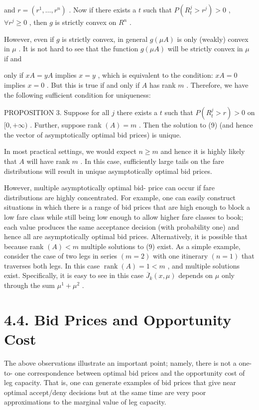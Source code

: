 and \(r = (r^{1},\ldots ,r^{n})\) . Now if there exists a \(t\) such
that \(P(R_{t}^{j} > r^{j}) > 0\) , \(\forall r^{j}\geq 0\) , then \(g\)
is strictly convex on \(R^{n}\) .

However, even if \(g\) is strictly convex, in general \(g(\mu A)\) is
only (weakly) convex in \(\mu\) . It is not hard to see that the
function \(g(\mu A)\) will be strictly convex in \(\mu\) if and

only if \(xA = yA\) implies \(x = y\) , which is equivalent to the
condition: \(xA = 0\) implies \(x = 0\) . But this is true if and only
if \(A\) has rank \(m\) . Therefore, we have the following sufficient
condition for uniqueness:

PROPOSITION 3. Suppose for all \(j\) there exists a \(t\) such that
\(P(R_{t}^{j} > r) > 0\) on \([0, + \infty)\) . Further, suppose rank
\((A) = m\) . Then the solution to (9) (and hence the vector of
asymptotically optimal bid prices) is unique.

In most practical settings, we would expect \(n\geqslant m\) and hence
it is highly likely that \(A\) will have rank \(m\) . In this case,
sufficiently large tails on the fare distributions will result in unique
asymptotically optimal bid prices.

However, multiple asymptotically optimal bid- price can occur if fare
distributions are highly concentrated. For example, one can easily
construct situations in which there is a range of bid prices that are
high enough to block a low fare class while still being low enough to
allow higher fare classes to book; each value produces the same
acceptance decision (with probability one) and hence all are
asymptotically optimal bid prices. Alternatively, it is possible that
because rank \((A)< m\) multiple solutions to (9) exist. As a simple
example, consider the case of two legs in series \((m = 2)\) with one
itinerary \((n = 1)\) that traverses both legs. In this case
\(\operatorname {rank}(A) = 1< m\) , and multiple solutions exist.
Specifically, it is easy to see in this case \(\overline{J}_{k}(x,\mu)\)
depends on \(\mu\) only through the sum \(\mu^{1} + \mu^{2}\) .

\section{4.4. Bid Prices and Opportunity
Cost}\label{bid-prices-and-opportunity-cost}

The above observations illustrate an important point; namely, there is
not a one- to- one correspondence between optimal bid prices and the
opportunity cost of leg capacity. That is, one can generate examples of
bid prices that give near optimal accept/deny decisions but at the same
time are very poor approximations to the marginal value of leg capacity.

